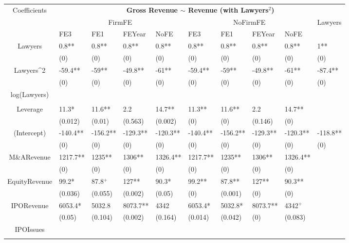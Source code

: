 \documentclass{article}
\begin{document}
\begin{table}[H]
\centering
\begin{tabular}{|clllllllll|}
\hline
\multirow{3}{*}{Coefficients} & \multicolumn{9}{c|}{\textbf{Gross Revenue $\sim$ Revenue (with Lawyers$^2$)}} \\
\cline{2-10}
& \multicolumn{4}{c}{FirmFE} & \multicolumn{4}{c}{NoFirmFE} & \multirow{2}{*}{Lawyers} \\
\cline{2-9}
& FE3 & FE1 & FEYear & NoFE & FE3 & FE1 & FEYear & NoFE &  \\
\hline
 
Lawyers & 0.8** & 0.8** & 0.8** & 0.8** & 0.8** & 0.8** & 0.8** & 0.8** & 1** \\ 
   & (0) & (0) & (0) & (0) & (0) & (0) & (0) & (0) & (0) \\ 
  Lawyers^2 & -59.4** & -59** & -49.8** & -61** & -59.4** & -59** & -49.8** & -61** & -87.4** \\ 
   & (0) & (0) & (0) & (0) & (0) & (0) & (0) & (0) & (0) \\ 
  log(Lawyers) &  &  &  &  &  &  &  &  &  \\ 
   &  &  &  &  &  &  &  &  &  \\ 
  Leverage & 11.3* & 11.6** & 2.2 & 14.7** & 11.3** & 11.6** & 2.2 & 14.7** &  \\ 
   & (0.012) & (0.01) & (0.563) & (0.002) & (0) & (0) & (0.146) & (0) &  \\ 
  (Intercept) & -140.4** & -156.2** & -129.3** & -120.3** & -140.4** & -156.2** & -129.3** & -120.3** & -118.8** \\ 
   & (0) & (0) & (0) & (0) & (0) & (0) & (0) & (0) & (0) \\ 
  M\&ARevenue & 1217.7** & 1235** & 1306** & 1326.4** & 1217.7** & 1235** & 1306** & 1326.4** &  \\ 
   & (0) & (0) & (0) & (0) & (0) & (0) & (0) & (0) &  \\ 
  EquityRevenue & 99.2* & 87.8$^{+}$ & 127** & 90.3* & 99.2** & 87.8** & 127** & 90.3** &  \\ 
   & (0.036) & (0.055) & (0.002) & (0.05) & (0) & (0.001) & (0) & (0) &  \\ 
  IPORevenue & 6053.4* & 5032.8 & 8073.7** & 4342 & 6053.4* & 5032.8* & 8073.7** & 4342$^{+}$ &  \\ 
   & (0.05) & (0.104) & (0.002) & (0.164) & (0.014) & (0.042) & (0) & (0.083) &  \\ 
  IPOIssues &  &  &  &  &  &  &  &  &  \\ 
   &  &  &  &  &  &  &  &  &  \\ 

\end{tabular}
\end{table}
\end{document}
